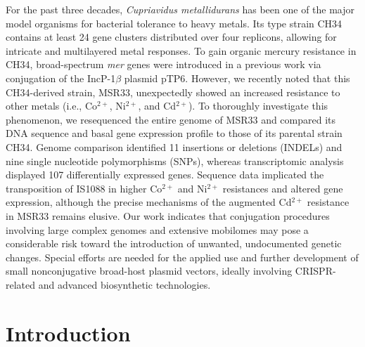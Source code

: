 For the past three decades, \textit{Cupriavidus metallidurans} has been one of the major model organisms for bacterial tolerance to heavy metals. Its type strain CH34 contains at least 24 gene clusters distributed over four replicons, allowing for intricate and multilayered metal responses. To gain organic mercury resistance in CH34, broad-spectrum \textit{mer} genes were introduced in a previous work via conjugation of the IncP-1$\beta$ plasmid pTP6. However, we recently noted that this CH34-derived strain, MSR33, unexpectedly showed an increased resistance to other metals (i.e., Co$^{2+}$, Ni$^{2+}$, and Cd$^{2+}$). To thoroughly investigate this phenomenon, we resequenced the entire genome of MSR33 and compared its DNA sequence and basal gene expression profile to those of its parental strain CH34. Genome comparison identified 11 insertions or deletions (INDELs) and nine single nucleotide polymorphisms (SNPs), whereas transcriptomic analysis displayed 107 differentially expressed genes. Sequence data implicated the transposition of IS1088 in higher Co$^{2+}$ and Ni$^{2+}$ resistances and altered gene expression, although the precise mechanisms of the augmented Cd$^{2+}$ resistance in MSR33 remains elusive. Our work indicates that conjugation procedures involving large complex genomes and extensive mobilomes may pose a considerable risk toward the introduction of unwanted, undocumented genetic changes. Special efforts are needed for the applied use and further development of small nonconjugative broad-host plasmid vectors, ideally involving CRISPR-related and advanced biosynthetic technologies.

\section{Introduction}

